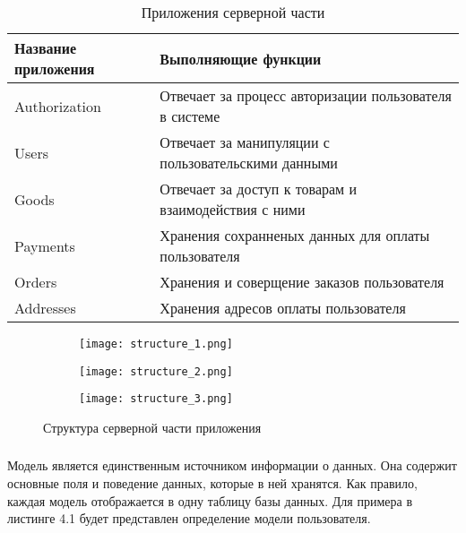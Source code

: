 \begin{longtable}{ | l | p{6cm} | }
    \caption{Приложения серверной части}
    \label{back:apps}
    \endfirsthead
    \endhead
    \hline
    Название приложения & Выполняющие функции \\ \hline
    Authorization & Отвечает за процесс авторизации пользователя в системе \\ \hline
    Users & Отвечает за манипуляции с пользовательскими данными \\ \hline
    Goods & Отвечает за доступ к товарам и взаимодействия с ними \\ \hline
    Payments & Хранения сохранненых данных для оплаты пользователя\\ \hline
    Orders & Хранения и соверщение заказов пользователя \\ \hline
    Addresses & Хранения адресов оплаты пользователя \\ \hline
\end{longtable}

\begin{figure}[h!]
    \begin{subfigure}[b]{0.3\textwidth}
    \centering
    \texttt{[image: structure\_1.png]}
    \caption{}
    \end{subfigure}
    \begin{subfigure}[b]{0.3\textwidth}
    \centering
    \texttt{[image: structure\_2.png]}
    \caption{}
    \end{subfigure}
    \begin{subfigure}[b]{0.3\textwidth}
    \centering
    \texttt{[image: structure\_3.png]}
    \caption{}
    \end{subfigure}
    \caption{ Структура серверной части приложения }
    \label{back:struct}
\end{figure}

\subsubsection{}

Модель является единственным источником информации о данных.
Она содержит основные поля и поведение данных, которые в ней хранятся.
Как правило, каждая модель отображается в одну таблицу базы данных.
Для примера в листинге 4.1 будет представлен определение модели пользователя.

